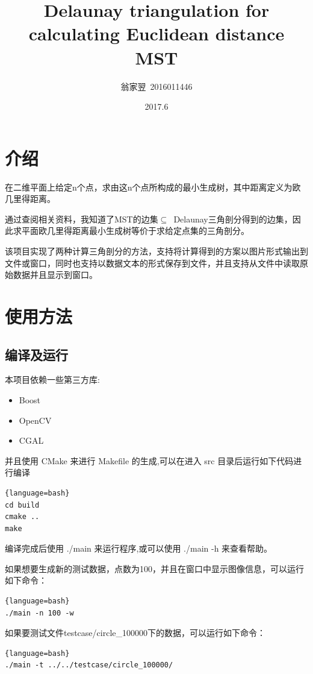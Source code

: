 \documentclass[a4paper]{article}
\title{\bf Delaunay triangulation for calculating Euclidean distance MST}
\date{2017.6}
\author{翁家翌~2016011446}
\begin{document}
\kaishu
\ttfamily
\maketitle
\tableofcontents
\section{介绍}
在二维平面上给定n个点，求由这n个点所构成的最小生成树，其中距离定义为欧几里得距离。

通过查阅相关资料，我知道了MST的边集$\subseteq$~Delaunay三角剖分得到的边集，因此求平面欧几里得距离最小生成树等价于求给定点集的三角剖分。

该项目实现了两种计算三角剖分的方法，支持将计算得到的方案以图片形式输出到文件或窗口，同时也支持以数据文本的形式保存到文件，并且支持从文件中读取原始数据并且显示到窗口。
\section{使用方法}
\subsection{编译及运行}
本项目依赖一些第三方库:
\begin{itemize}
	\item Boost
	\item OpenCV
	\item CGAL
\end{itemize}
并且使用 CMake 来进行 Makefile 的生成,可以在进入 src 目录后运行如下代码进行编译
\begin{lstlisting}{language=bash}
cd build
cmake ..
make
\end{lstlisting}
编译完成后使用 ./main 来运行程序,或可以使用 ./main -h 来查看帮助。

如果想要生成新的测试数据，点数为100，并且在窗口中显示图像信息，可以运行如下命令：
\begin{lstlisting}{language=bash}
./main -n 100 -w
\end{lstlisting}

如果要测试文件testcase/circle\_100000下的数据，可以运行如下命令：
\begin{lstlisting}{language=bash}
./main -t ../../testcase/circle_100000/
\end{lstlisting}
\end{document}
